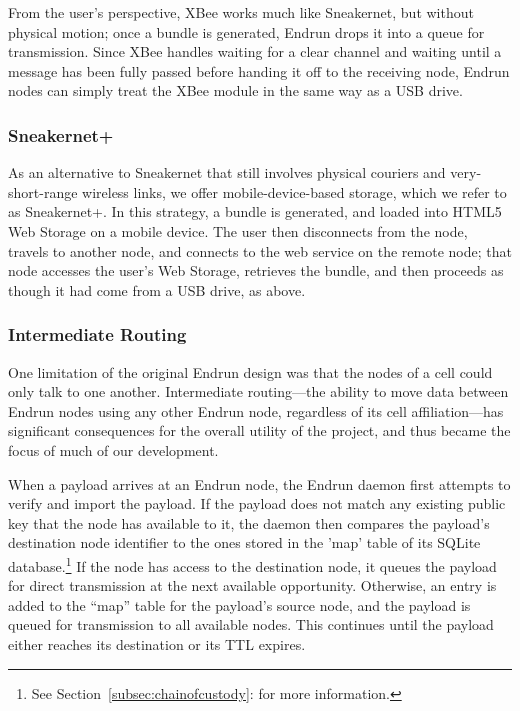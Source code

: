 \documentclass[12pt]{article}
\begin{document}
  From the user's perspective, XBee works much like Sneakernet, but without physical motion; once a bundle is generated, Endrun drops it into a queue for transmission. Since XBee handles waiting for a clear channel and waiting until a message has been fully passed before handing it off to the receiving node, Endrun nodes can simply treat the XBee module in the same way as a USB drive.
  
  \subsubsection{Sneakernet+}
  
  As an alternative to Sneakernet that still involves physical couriers and very-short-range wireless links, we offer mobile-device-based storage, which we refer to as Sneakernet+. In this strategy, a bundle is generated, and loaded into HTML5 Web Storage on a mobile device. The user then disconnects from the node, travels to another node, and connects to the web service on the remote node; that node accesses the user's Web Storage, retrieves the bundle, and then proceeds as though it had come from a USB drive, as above.
  
  \subsubsection{Intermediate Routing}
  \label{subsec:introuting}

  One limitation of the original Endrun design was that the nodes of a cell could only talk to one another. Intermediate routing---the ability to move data between Endrun nodes using any other Endrun node, regardless of its cell affiliation---has significant consequences for the overall utility of the project, and thus became the focus of much of our development.
  
  When a payload arrives at an Endrun node, the Endrun daemon first attempts to verify and import the payload. If the payload does not match any existing public key that the node has available to it, the daemon then compares the payload's destination node identifier to the ones stored in the 'map' table of its SQLite database.\footnote{See Section~\ref{subsec:chainofcustody}: for more information.} If the node has access to the destination node, it queues the payload for direct transmission at the next available opportunity. Otherwise, an entry is added to the ``map'' table for the payload's source node, and the payload is queued for transmission to all available nodes. This continues until the payload either reaches its destination or its TTL expires.
  
\end{document}
